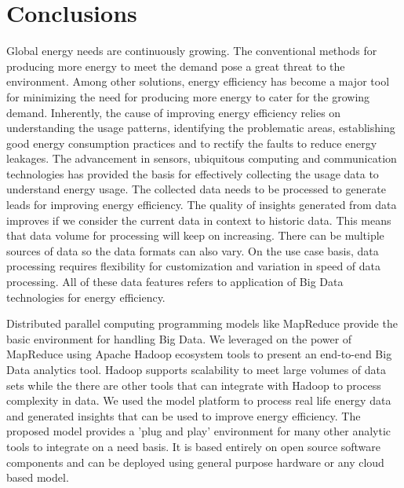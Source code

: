 \chapter{Conclusions}
\label{chapter:concluion}

Global energy needs are continuously growing. The conventional methods for producing more energy to meet the demand pose a great threat to the environment. Among other solutions, energy efficiency has become a major tool for minimizing the need for producing more energy to cater for the growing demand. Inherently, the cause of improving energy efficiency relies on understanding the usage patterns, identifying the problematic areas, establishing good energy consumption practices and to rectify the faults to reduce energy leakages. The advancement in sensors, ubiquitous computing  and communication technologies has provided the basis for effectively collecting the usage data to understand energy usage. The collected data needs to be processed to generate leads for improving energy efficiency. The quality of insights generated from data improves if we consider the current data in context to historic data. This means that data volume for processing will keep on increasing. There can be multiple sources of data so the data formats can also vary. On the use case basis, data processing requires flexibility for customization and variation in speed of data processing. All of these data features refers to application of Big Data technologies for energy efficiency. 

Distributed parallel computing programming models like MapReduce provide the basic environment for handling Big Data. We leveraged on the power of MapReduce using Apache Hadoop ecosystem tools to present an end-to-end Big Data analytics tool. Hadoop supports scalability to meet large volumes of data sets while the there are other tools that can integrate with Hadoop to process complexity in data. We used the model platform to process real life energy data and generated insights that can be used to improve energy efficiency. The proposed model provides a 'plug and play' environment for many other analytic tools to integrate on a need basis. It is based entirely on open source software components and can be deployed using general purpose hardware or any cloud based model.

